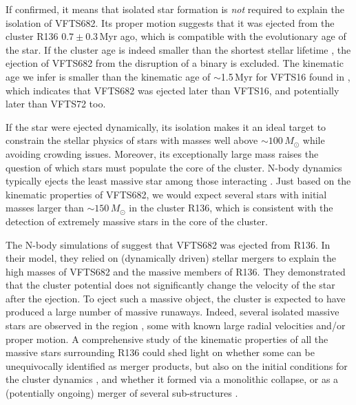 \documentclass[a4paper,fleqn,usenatbib]{mnras}
\begin{document}
If confirmed, it means that isolated star formation is
\emph{not} required to explain the isolation of VFTS682. Its proper motion suggests that it was ejected from the cluster R136
$0.7\pm0.3$\,Myr ago, which is compatible with the evolutionary age of
the star. If the
cluster age \citep[$\lesssim2$\,Myr,][]{crowther:10, sabbi:12} is
indeed smaller than the shortest stellar lifetime
\citep[$\sim$3\,Myr,][]{brott:11,kohler:15, zapartas:17}, the ejection of VFTS682
from the disruption of a binary is excluded. %
The kinematic age we infer is smaller than the kinematic age of
$\sim$1.5\,Myr for VFTS16 found in \cite{lennon:18}, which indicates
that VFTS682 was ejected later than VFTS16, and potentially later than
VFTS72 too.


If the star were ejected dynamically, its isolation makes it an ideal target to constrain the stellar physics of
stars with masses well above $\sim$$100\,M_\odot$ while avoiding
crowding issues. Moreover, 
 its exceptionally large mass raises the question of which stars must populate
the core of the cluster. N-body dynamics typically ejects the least
massive star among those interacting \cite[e.g.,][]{banerjee:12}. Just
based on the kinematic properties of VFTS682, we would expect several
stars with initial masses larger than $\sim$$150\,M_\odot$ in the
cluster R136, which is consistent with the detection
of extremely massive stars in the core of the
cluster.

The N-body simulations of \citet{banerjee:12} suggest that VFTS682 was ejected from R136. In their
model, they relied on (dynamically driven) stellar mergers to explain the high masses of
VFTS682 and the massive members of R136. They
demonstrated that the cluster potential does not significantly change
the velocity of the star after the ejection.
To eject such a massive object, the cluster is
expected to have produced a large number of massive runaways. Indeed, several %
isolated massive stars are observed in the region \citep[][]{evans:10,lennon:18}, some with known
large radial velocities and/or proper motion. 
A comprehensive study of the kinematic
properties of all the massive stars surrounding R136 could shed light
on whether some can be unequivocally identified as merger products,
but also on the initial conditions for the cluster dynamics
\citep[e.g.,][]{oh:16}, and whether it formed via a monolithic collapse, or
as a (potentially ongoing) merger of several sub-structures \citep[e.g.,][]{sabbi:12}.
\end{document}
